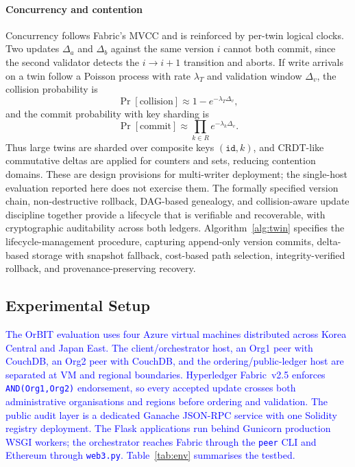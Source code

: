 \documentclass[final,5p,times,twocolumn]{elsarticle}
\begin{document}
\paragraph*{\textbf{Concurrency and contention}}
Concurrency follows Fabric's MVCC and is reinforced by per-twin logical clocks. Two updates $\Delta_a$ and $\Delta_b$ against the same version $i$ cannot both commit, since the second validator detects the $i\!\to\!i{+}1$ transition and aborts. If write arrivals on a twin follow a Poisson process with rate $\lambda_T$ and validation window $\Delta_v$, the collision probability is
\begin{equation}
  \Pr[\mathrm{collision}] \approx 1 - e^{-\lambda_T\Delta_v},
  \label{eq:collision}
\end{equation}
and the commit probability with key sharding is
\begin{equation}
  \Pr[\mathrm{commit}] \approx \prod_{k\in R} e^{-\lambda_k\Delta_v}.
  \label{eq:commit_prob_dt}
\end{equation}
Thus large twins are sharded over composite keys $(\texttt{id},k)$, and CRDT-like commutative deltas are applied for counters and sets, reducing contention domains. These are design provisions for multi-writer deployment; the single-host evaluation reported here does not exercise them. The formally specified version chain, non-destructive rollback, DAG-based genealogy, and collision-aware update discipline together provide a lifecycle that is verifiable and recoverable, with cryptographic auditability across both ledgers. Algorithm~\ref{alg:twin} specifies the lifecycle-management procedure, capturing append-only version commits, delta-based storage with snapshot fallback, cost-based path selection, integrity-verified rollback, and provenance-preserving recovery.

\subsection{\textbf{Experimental Setup}}
\label{sec:exp_setup}
\textcolor{blue}{The OrBIT evaluation uses four Azure virtual machines distributed across Korea Central and Japan East. The client/orchestrator host, an Org1 peer with CouchDB, an Org2 peer with CouchDB, and the ordering/public-ledger host are separated at VM and regional boundaries. Hyperledger Fabric~v2.5 enforces \texttt{AND(Org1,Org2)} endorsement, so every accepted update crosses both administrative organisations and regions before ordering and validation. The public audit layer is a dedicated Ganache JSON-RPC service with one Solidity registry deployment. The Flask applications run behind Gunicorn production WSGI workers; the orchestrator reaches Fabric through the \texttt{peer} CLI and Ethereum through \texttt{web3.py}. Table~\ref{tab:env} summarises the testbed.}
\end{document}
